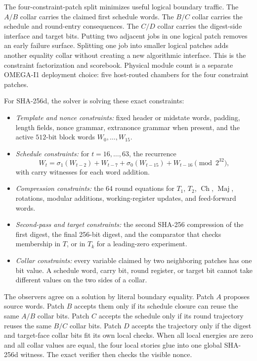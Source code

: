 \documentclass[11pt]{article}
\theoremstyle{definition}
\theoremstyle{remark}
\newcommand{\Ch}{\operatorname{Ch}}
\newcommand{\Maj}{\operatorname{Maj}}
\begin{document}
The four-constraint-patch split minimizes useful logical boundary traffic. The \(A/B\)
collar carries the claimed first schedule words. The \(B/C\) collar carries the
schedule and round-entry consequences. The \(C/D\) collar carries the
digest-side interface and target bits. Putting two adjacent jobs in one logical
patch removes an early failure surface. Splitting one job into smaller logical
patches adds another equality collar without creating a new algorithmic
interface. This is the constraint factorization and scorebook. Physical module
count is a separate OMEGA-I1 deployment choice: five host-routed chambers for
the four constraint patches.

For SHA-256d, the solver is solving these exact constraints:

\begin{itemize}
\item \emph{Template and nonce constraints:} fixed header or midstate words,
padding, length fields, nonce grammar, extranonce grammar when present, and the
active \(512\)-bit block words \(W_0,\ldots,W_{15}\).
\item \emph{Schedule constraints:} for \(t=16,\ldots,63\), the recurrence
\[
W_t=\sigma_1(W_{t-2})+W_{t-7}+\sigma_0(W_{t-15})+W_{t-16}\pmod {2^{32}},
\]
with carry witnesses for each word addition.
\item \emph{Compression constraints:} the 64 round equations for \(T_1\),
\(T_2\), \(\Ch\), \(\Maj\), rotations, modular additions, working-register
updates, and feed-forward words.
\item \emph{Second-pass and target constraints:} the second SHA-256 compression
of the first digest, the final 256-bit digest, and the comparator that checks
membership in \(T\), or in \(T_k\) for a leading-zero experiment.
\item \emph{Collar constraints:} every variable claimed by two neighboring
patches has one bit value. A schedule word, carry bit, round register, or target
bit cannot take different values on the two sides of a collar.
\end{itemize}

The observers agree on a solution by literal boundary equality. Patch \(A\)
proposes source words. Patch \(B\) accepts them only if its schedule closure can
reuse the same \(A/B\) collar bits. Patch \(C\) accepts the schedule only if its
round trajectory reuses the same \(B/C\) collar bits. Patch \(D\) accepts the
trajectory only if the digest and target-face collar bits fit its own local
checks. When all local energies are zero and all collar values are equal, the
four local stories glue into one global SHA-256d witness. The exact verifier
then checks the visible nonce.
\end{document}
